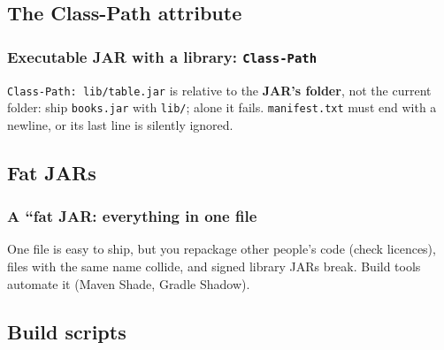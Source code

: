 \documentclass[aspectratio=169,10pt,compress]{beamer}
\begin{document}

\subsection[Class-Path]{The Class-Path attribute}




\begin{frame}[t,fragile] \frametitle{Executable JAR with a library: \texttt{Class-Path}}

  \vspace{0.1em}
  \small
  \texttt{Class-Path: lib/table.jar} is relative to the \textbf{JAR's folder}, not the current folder: ship \texttt{books.jar} with \texttt{lib/};
  alone it fails. \texttt{manifest.txt} must end with a newline, or its last line is silently ignored.
\end{frame}

\subsection[Fat JAR]{Fat JARs}




\begin{frame}[t,fragile] \frametitle{A ``fat JAR: everything in one file}

  \vspace{0.1em}
  \small
  One file is easy to ship, but you repackage other people's code (check licences), files with the same name collide,
  and signed library JARs break. Build tools automate it (Maven Shade, Gradle Shadow).
\end{frame}

\subsection[Scripts]{Build scripts}
\end{document}
